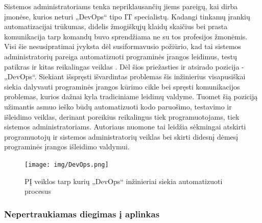\documentclass{VUMIFPSkursinis}
\begin{document}
Sistemos administratoriams tenka nepriklausančių jiems pareigų, kai dirba įmonėse, kurios neturi „DevOps“ tipo IT specialistų. Kadangi tinkamų įrankių automatizacijai trūkumas, didelis žmogiškųjų klaidų skaičius bei prasta komunikacija tarp komandų buvo sprendžiama ne su tos profesijos žmonėmis. Visi šie nesusipratimai įvyksta dėl susiformavusio požiūrio, kad tai sistemos administratorių pareiga automatizuoti programinės įrangos leidimus, testų patikras ir kitas reikalingas veiklas \cite{SaltTrecias}. Dėl šios priežasties ir atsirado pozicija - „DevOps“. Siekiant išspręsti išvardintas problemas šis inžinierius visapusiškai siekia dalyvauti programinės įrangos kūrimo cikle bei spręsti komunikacijos problemas, kurios dažnai kyla tradiciniame leidimų valdyme. Tuomet šią poziciją užimantis asmuo ieško būdų automatizuoti kodo paruošimo, testavimo ir išleidimo veiklas, derinant poreikius reikalingus tiek programuotojams, tiek sistemos administratoriams. Autoriaus nuomone tai leidžia sėkmingai atskirti programuotojų ir sistemos administratorių veiklas bei skirti didesnį dėmesį programinės įrangos išleidimo valdymui.

\begin{figure}[H]
    \centering
    \texttt{[image: img/DevOps.png]}
    \caption{PĮ veiklos tarp kurių „DevOps“ inžinieriai siekia automatizuoti procesus}
    \label{img:mlp}
\end{figure}

    \subsubsection{Nepertraukiamas diegimas į aplinkas}
    
\end{document}
